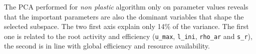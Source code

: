 
\begin{figure}%
    \classiccaptionstyle
{}
\end{figure}

The PCA performed for \textit{non plastic} algorithm only on parameter values reveals that the important parameters are also the dominant variables that shape the selected subspace. The two first axis explain only 14\% of the variance. The first one is related to the root activity and efficiency (\texttt{u\_max}, \texttt{l\_ini}, \texttt{rho\_ar} and \texttt{s\_r}), the second is in line with global efficiency and resource availability.

